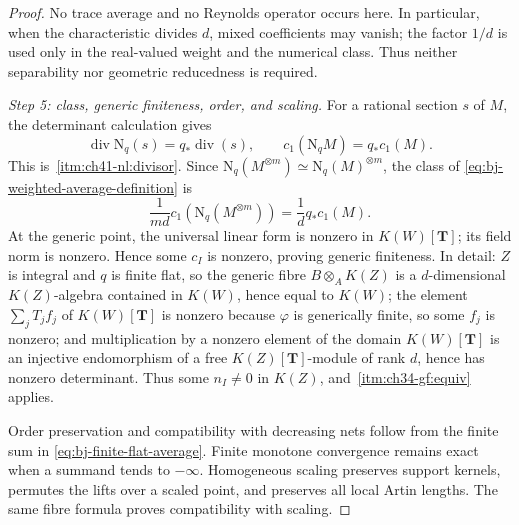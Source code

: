 \begin{proof}
No trace average and no Reynolds operator occurs here.  In particular,
when the characteristic divides $d$, mixed coefficients may vanish; the
factor $1/d$ is used only in the real-valued weight and the numerical
class.  Thus neither separability nor geometric reducedness is required.

\medskip
\noindent\emph{Step 5: class, generic finiteness, order, and scaling.}
For a rational section $s$ of $M$, the determinant calculation gives
\[
 \operatorname{div}\mathrm N_q(s)=q_*\operatorname{div}(s),\qquad
 c_1(\mathrm N_qM)=q_*c_1(M).
\tag{41.32}\label{eq:bj-norm-divisor}
\]
This is
\,\cref{itm:ch41-nl:divisor}.  Since
$\mathrm N_q(M^{\otimes m})\simeq\mathrm N_q(M)^{\otimes m}$, the class of
\eqref{eq:bj-weighted-average-definition} is
\[
 \frac1{md}c_1\left(\mathrm N_q(M^{\otimes m})\right)
 =\frac1dq_*c_1(M).
\]
At the generic point, the universal linear form is nonzero in
$K(W)[\mathbf T]$; its field norm is nonzero.  Hence some $c_I$ is
nonzero, proving generic finiteness.  In detail: $Z$ is integral and
$q$ is finite flat, so the generic fibre $B\otimes_AK(Z)$ is a
$d$-dimensional $K(Z)$-algebra contained in $K(W)$, hence equal to
$K(W)$; the element $\sum_jT_jf_j$ of $K(W)[\mathbf T]$ is nonzero
because $\varphi$ is generically finite, so some $f_j$ is nonzero; and
multiplication by a nonzero element of the domain $K(W)[\mathbf T]$ is an
injective endomorphism of a free $K(Z)[\mathbf T]$-module of rank $d$,
hence has nonzero determinant.  Thus some $n_I\ne0$ in $K(Z)$, and
\,\cref{itm:ch34-gf:equiv} applies.

Order preservation and compatibility with decreasing nets follow from the
finite sum in \eqref{eq:bj-finite-flat-average}.  Finite monotone
convergence remains exact when a summand tends to $-\infty$.  Homogeneous
scaling preserves support kernels, permutes the lifts over a scaled point,
and preserves all local Artin lengths.  The same fibre formula proves
compatibility with scaling.


\end{proof}
